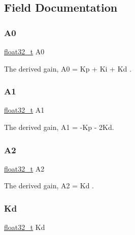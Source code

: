 \subsection{Field Documentation}
\mbox{\label{structarm__pid__instance__f32_afc2ed2bf70b7d9d84f49ee9ae7caa004}} 
\subsubsection{\texorpdfstring{A0}{A0}}
{\footnotesize\ttfamily \mbox{\hyperlink{arm__math_8h_a4611b605e45ab401f02cab15c5e38715}{float32\+\_\+t}} A0}

The derived gain, A0 = Kp + Ki + Kd . \mbox{\label{structarm__pid__instance__f32_a5e6785a3a5cf7b98f3bfc7b180d98273}} 
\subsubsection{\texorpdfstring{A1}{A1}}
{\footnotesize\ttfamily \mbox{\hyperlink{arm__math_8h_a4611b605e45ab401f02cab15c5e38715}{float32\+\_\+t}} A1}

The derived gain, A1 = -\/Kp -\/ 2Kd. \mbox{\label{structarm__pid__instance__f32_a5b00947275caf079f351271bf41573fe}} 
\subsubsection{\texorpdfstring{A2}{A2}}
{\footnotesize\ttfamily \mbox{\hyperlink{arm__math_8h_a4611b605e45ab401f02cab15c5e38715}{float32\+\_\+t}} A2}

The derived gain, A2 = Kd . \mbox{\label{structarm__pid__instance__f32_ace6b9e405a991cbaf6b4c137ca0d51a3}} 
\subsubsection{\texorpdfstring{Kd}{Kd}}
{\footnotesize\ttfamily \mbox{\hyperlink{arm__math_8h_a4611b605e45ab401f02cab15c5e38715}{float32\+\_\+t}} Kd}


